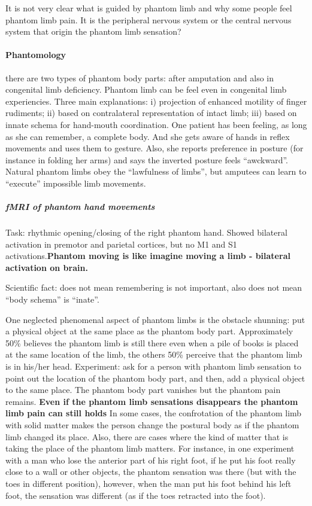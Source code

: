 \documentclass[12pt,article,oneside,a4paper]{memoir}
\begin{document}
It is not very clear what is guided by phantom limb and why some people feel phantom limb pain. It is the peripheral nervous system or the central nervous system that origin the phantom limb sensation?

\paragraph{Phantomology} there are two types of phantom body parts: after amputation and also in congenital limb deficiency.
Phantom limb can be feel even in congenital limb experiencies. Three main explanations: i) projection of enhanced motility of finger rudiments; ii) based on contralateral representation of intact limb; iii) based on innate schema for hand-mouth coordination. 
One patient has been feeling, as long as she can remember, a complete body. And she gets aware of hands in reflex movements and uses them to gesture. Also, she reports preference in posture (for instance in folding her arms) and says the inverted posture feels ``awckward''. Natural phantom limbs obey the ``lawfulness of limbs'', but amputees can learn to ``execute'' impossible limb movements.

\subparagraph{fMRI of phantom hand movements} Task: rhythmic opening/closing of the right phantom hand. Showed bilateral activation in premotor and parietal cortices, but no M1 and S1 activations.\textbf{Phantom moving is like imagine moving a limb - bilateral activation on brain.}
 
Scientific fact: does not mean remembering is not important, also does not mean ``body schema'' is ``inate''.

One neglected phenomenal aspect of phantom limbs is the obstacle shunning: put a physical object at the same place as the phantom body part. Approximately 50\% believes the phantom limb is still there even when a pile of books is placed at the same location of the limb, the others 50\% perceive that the phantom limb is in his/her head. Experiment: ask for a person with phantom limb sensation to point out the location of the phantom body part, and then, add a physical object to the same place. The phantom body part vanishes but the phantom pain remains. \textbf{Even if the phantom limb sensations disappears the phantom limb pain can still holds} In some cases, the confrotation of the phantom limb with solid matter makes the person change the postural body as if the phantom limb changed its place. Also, there are cases where the kind of matter that is taking the place of the phantom limb matters. For instance, in one experiment with a man who lose the anterior part of his right foot, if he put his foot really close to a wall or other objects, the phantom sensation was there (but with the toes in different position), however, when the man put his foot behind his left foot, the sensation was different (as if the toes retracted into the foot).
\end{document}
